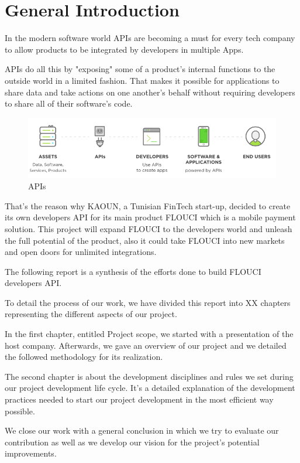 \chapter*{General Introduction}
\graphicspath{{Introduction/figures/}}
\begin{spacing}{1.2}

In the modern software world APIs are becoming a must for every tech company to allow products to be integrated by developers in multiple Apps.

APIs do all this by "exposing" some of a product's internal functions to the outside world in a limited fashion. That makes it possible for applications to share data and take actions on one another's behalf without requiring developers to share all of their software's code. 



\begin{figure}[!ht]\centering
\includegraphics[scale=0.6]{API.png}
\caption{APIs }
\label{fig:fig1}
\end{figure}

That's the reason why KAOUN, a Tunisian FinTech start-up, decided to create its own developers API for its main product FLOUCI which is a mobile payment solution. This project will expand FLOUCI to the developers world and unleash the full potential of the product, also it could take FLOUCI into new markets and open doors for unlimited integrations.\newline


The following report is a synthesis of the efforts done to build FLOUCI developers API.

 To detail the process of our work, we have divided this report into XX chapters representing the different aspects of our project.

In the first chapter, entitled Project scope, we started with a presentation of the host company. Afterwards, we gave an overview of our project and we detailed the followed methodology for its realization.


The second chapter is about the development disciplines and rules we set during our project development life cycle. It's a detailed explanation of the development practices needed to start our project development in the most efficient way possible. 



We close our work with a general conclusion in which we try to evaluate our contribution as well as we develop our vision for the project's potential improvements.




\end{spacing}
